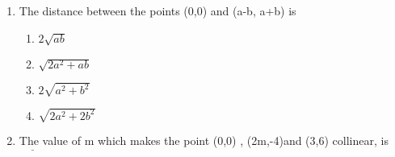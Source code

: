 \begin{enumerate}
\item The distance between the points (0,0) and (a-b, a+b) is                                                
\begin{enumerate}                                     
\item $2{\sqrt{ab}}$                                   
\item $\sqrt{2a^2 + ab}$                              
\item $ 2\sqrt{a^2 + b^2}$                             
\item $ \sqrt{2a^2 + 2b^2}$
\end{enumerate}
\item The value of m which makes the point (0,0) , (2m,-4)and (3,6) collinear, is $\underline{\hspace{1cm}}$  
\end{enumerate}
